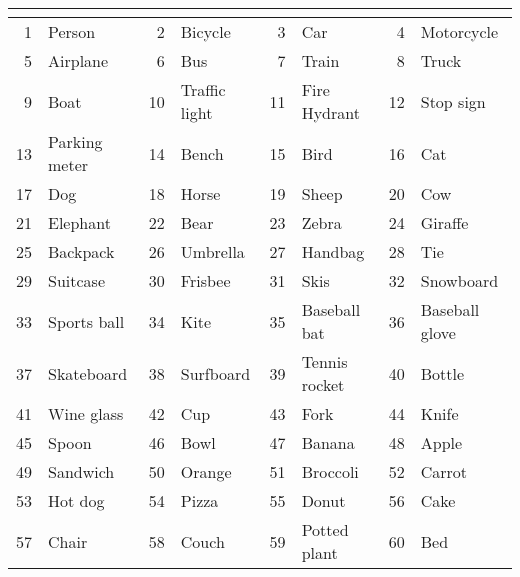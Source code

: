 \documentclass{article}
\begin{document}
\begin{table}[h]
\begin{tabular}{rl|rl|rl|rl}
\multicolumn{2}{c|}{} & \multicolumn{2}{c|}{} & \multicolumn{2}{c|}{} & \multicolumn{2}{c}{} \\ \hline
1       & Person            & 2      & Bicycle           & 3      & Car               & 4      & Motorcycle        \\
5       & Airplane          & 6      & Bus               & 7      & Train             & 8      & Truck             \\
9       & Boat              & 10     & Traffic light     & 11     & Fire Hydrant      & 12     & Stop sign         \\
13      & Parking meter     & 14     & Bench             & 15     & Bird              & 16     & Cat               \\
17      & Dog               & 18     & Horse             & 19     & Sheep             & 20     & Cow               \\
21      & Elephant          & 22     & Bear              & 23     & Zebra             & 24     & Giraffe           \\
25      & Backpack          & 26     & Umbrella          & 27     & Handbag           & 28     & Tie               \\
29      & Suitcase          & 30     & Frisbee           & 31     & Skis              & 32     & Snowboard         \\
33      & Sports ball       & 34     & Kite              & 35     & Baseball bat      & 36     & Baseball glove    \\
37      & Skateboard        & 38     & Surfboard         & 39     & Tennis rocket     & 40     & Bottle            \\
41      & Wine glass        & 42     & Cup               & 43     & Fork              & 44     & Knife             \\
45      & Spoon             & 46     & Bowl              & 47     & Banana            & 48     & Apple             \\
49      & Sandwich          & 50     & Orange            & 51     & Broccoli          & 52     & Carrot            \\
53      & Hot dog           & 54     & Pizza             & 55     & Donut             & 56     & Cake              \\
57      & Chair             & 58     & Couch             & 59     & Potted plant      & 60     & Bed               \\

\end{tabular}
\end{table}
\end{document}
